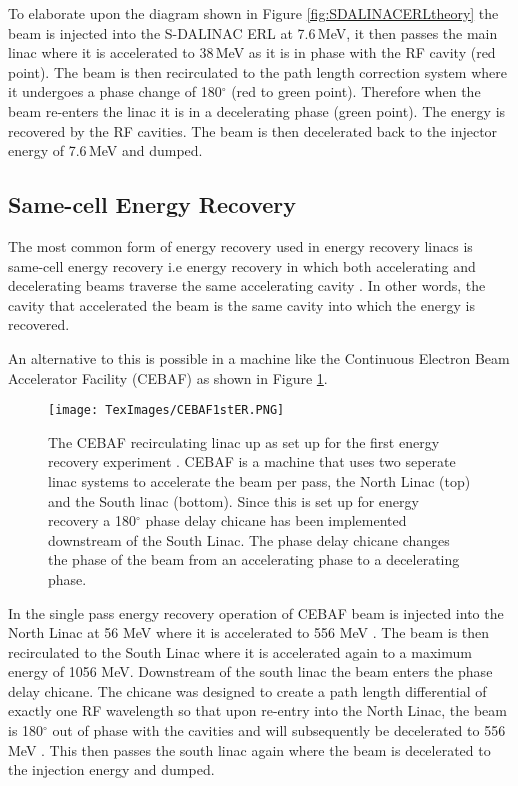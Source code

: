 \documentclass[11pt]{article}
\begin{document}
To elaborate upon the diagram shown in Figure \ref{fig:SDALINACERLtheory} the beam is injected into the S-DALINAC ERL at 7.6\,MeV, it then passes the main linac where it is accelerated to 38\,MeV \cite{SDALINACipac9} as it is in phase with the RF cavity (red point). The beam is then recirculated to the path length correction system where it undergoes a phase change of 180$^{\circ}$ (red to green point). Therefore when the beam re-enters the linac it is in a decelerating phase (green point). The energy is recovered by the RF cavities. The beam is then decelerated back to the injector energy of 7.6\,MeV and dumped.

\subsection{Same-cell Energy Recovery}
\label{sec:samecell}

The most common form of energy recovery used in energy recovery linacs is same-cell energy recovery i.e energy recovery in which both accelerating and decelerating beams traverse the same accelerating cavity \cite{JLabERLreview}. In other words, the cavity that accelerated the beam is the same cavity into which the energy is recovered.

An alternative to this is possible in a machine like the Continuous Electron Beam Accelerator Facility (CEBAF) as shown in Figure \ref{fig:CEBAF1stER}.

\begin{figure}[H]
\centering
\texttt{[image: TexImages/CEBAF1stER.PNG]}
\caption{\label{fig:CEBAF1stER} The CEBAF recirculating linac up as set up for the first energy recovery experiment \cite{CEBAF1stER}. CEBAF is a machine that uses two seperate linac systems to accelerate the beam per pass, the North Linac (top) and the South linac (bottom). Since this is set up for energy recovery a 180$^{\circ}$ phase delay chicane has been implemented downstream of the South Linac. The phase delay chicane changes the phase of the beam from an accelerating phase to a decelerating phase.}
\end{figure} 

In the single pass energy recovery operation of CEBAF beam is injected into the North Linac at 56 MeV where it is accelerated to 556 MeV \cite{CEBAF1stER}. The beam is then recirculated to the South Linac where it is accelerated again to a maximum energy of 1056 MeV. Downstream of the south linac the beam enters the phase delay chicane. The chicane was designed to create a path length differential of exactly one RF wavelength so that upon re-entry into the North Linac, the beam is 180$^{\circ}$ out of phase with the cavities and will subsequently be decelerated to 556 MeV \cite{CEBAF1stER}. This then passes the south linac again where the beam is decelerated to the injection energy and dumped.
\end{document}

